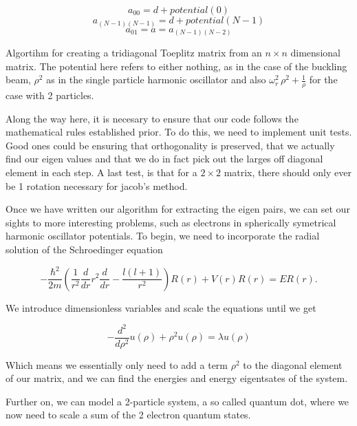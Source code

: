 \documentclass[10pt, twocolumn]{article}
\begin{document}
\begin{algorithm}
    \[ a_{00} = d + potential{(0)} \]
    \[ a_{{(N-1)}{(N-1)}} = d + potential{(N-1)} \]
    \[ a_{01} = a = a_{{(N-1)}{(N-2)}} \]
    \caption{Algortihm for creating a tridiagonal Toeplitz matrix from an $n\times n$ dimensional matrix. 
        The potential here refers to either nothing, as in the case of the buckling beam, $\rho^2$ as in the
        single particle harmonic oscillator and also $\omega_r^2\, \rho^2 + \frac{1}{\rho}$ for the case with 
        2 particles.}
\end{algorithm}

Along the way here, it is necesary to ensure that our code follows the mathematical rules 
established prior. To do this, we need to implement unit tests. Good ones could be ensuring 
that orthogonality is preserved, that we actually find our eigen values and that we do in fact
pick out the larges off diagonal element in each step. A last test, is that for a $2\times 2$ matrix, 
there should only ever be 1 rotation necessary for jacob's method. 

Once we have written our algorithm for extracting the eigen pairs, we can set our sights to 
more interesting problems, such as electrons in spherically symetrical harmonic oscillator 
potentials. To begin, we need to incorporate the radial solution of the Schroedinger equation

\begin{equation*}
  -\frac{\hbar^2}{2 m} \left ( \frac{1}{r^2} \frac{d}{dr} r^2
  \frac{d}{dr} - \frac{l (l + 1)}{r^2} \right )R(r) 
     + V(r) R(r) = E R(r).
\end{equation*}

We introduce dimensionless variables and scale the equations until we get 

\begin{equation*}
  -\frac{d^2}{d\rho^2} u(\rho) + \rho^2u(\rho)  = \lambda u(\rho) 
\end{equation*}

Which means we essentially only need to add a term $\rho^2$ to the diagonal element of our 
matrix, and we can find the energies and energy eigentsates of the system. 

Further on, we can model a 2-particle system, a so called quantum dot\cite{project2pdf},
where we now need to scale a sum of the 2 electron quantum states. 
\end{document}
